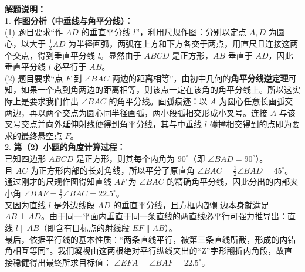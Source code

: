 \documentclass[12pt, a4paper]{ctexrep}
\begin{document}
{\small\color{gray}
\textbf{解题说明：}\\
1. \textbf{作图分析（中垂线与角平分线）：}\\
(1) 题目要求“作 $AD$ 的垂直平分线 $l$”，利用尺规作图：分别以定点 $A, D$ 为圆心，以大于 $\frac{1}{2}AD$ 为半径画弧，两弧在上方和下方各交于两点，用直尺且连接这两个交点，得到垂直平分线 $l$。显然由于 $ABCD$ 是正方形，$AB$ 垂直于 $AD$，因此垂直平分线 $l$ 必平行于 $AB$。\\
(2) 题目要求“点 $F$ 到 $\angle BAC$ 两边的距离相等”，由初中几何的\textbf{角平分线逆定理}可知，如果一个点到角两边的距离相等，则该点一定在该角的角平分线上。所以这实际上是要求我们作出 $\angle BAC$ 的角平分线。画弧痕迹：以 $A$ 为圆心任意长画弧交两边，再以两个交点为圆心同半径画弧，两小段弧相交形成小叉号。连接 $A$ 与该叉号交点并向外延伸射线便得到角平分线，其与中垂线 $l$ 碰撞相交得到的点即为要求的最终悬空点 $F$。\\
2. \textbf{第（2）小题的角度计算过程：}\\
已知四边形 $ABCD$ 是正方形，则其每个内角为 $90^\circ$（即 $\angle BAD = 90^\circ$）。\\
且 $AC$ 为正方形内部的长对角线，所以平分了原直角 $\angle BAC = \frac{1}{2}\angle BAD = 45^\circ$。\\
通过刚才的尺规作图得知直线 $AF$ 为 $\angle BAC$ 的精确角平分线，因此分出的内部夹小角 $\angle BAF = \frac{1}{2}\angle BAC = 22.5^\circ$。\\
又因为直线 $l$ 是外边线段 $AD$ 的垂直平分线，且方框内部侧边本身就满足 $AB \perp AD$。由于同一平面内垂直于同一条直线的两直线必平行可强力推导出：直线 $l \parallel AB$（即含有目标点的射线段 $EF \parallel AB$）。\\
最后，依据平行线的基本性质：“两条直线平行，被第三条直线所截，形成的内错角相互等同”。我们凝视由这两根绝对平行纵线夹出的“Z”字形翻折内角段，故直接稳健得出最终所求目标值： $\angle EFA = \angle BAF = 22.5^\circ$。
}

\vspace{0.6cm}
\end{document}

